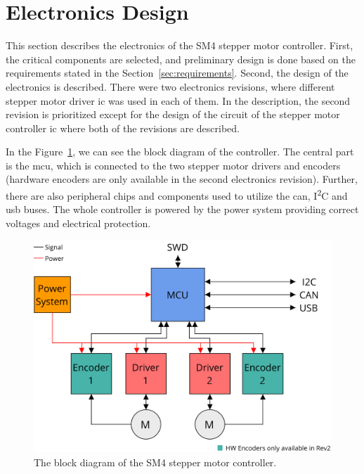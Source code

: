 \section{Electronics Design}
\label{sec:hardware}

This section describes the electronics of the SM4 stepper motor controller.
First, the critical components are selected, and preliminary design is done based on the requirements stated in the Section~\ref{sec:requirements}.
Second, the design of the electronics is described.
There were two electronics revisions, where different stepper motor driver \acs{ic} was used in each of them.
In the description, the second revision is prioritized except for the design of the circuit of the stepper motor controller \acs{ic} where both of the revisions are described.

In the Figure~\ref{fig:sm4diagram}, we can see the block diagram of the controller.
The central part is the \acs{mcu}, which is connected to the two stepper motor drivers and encoders (hardware encoders are only available in the second electronics revision).
Further, there are also peripheral chips and components used to utilize the \acs{can}, I\textsuperscript{2}C and \acs{usb} buses.
The whole controller is powered by the power system providing correct voltages and electrical protection.

\begin{figure}[H]
    \centering
    \includegraphics[width=\textwidth]{obrazky/sm4_block_diagram}
    \caption{The block diagram of the SM4 stepper motor controller.}
    \label{fig:sm4diagram}
\end{figure}



